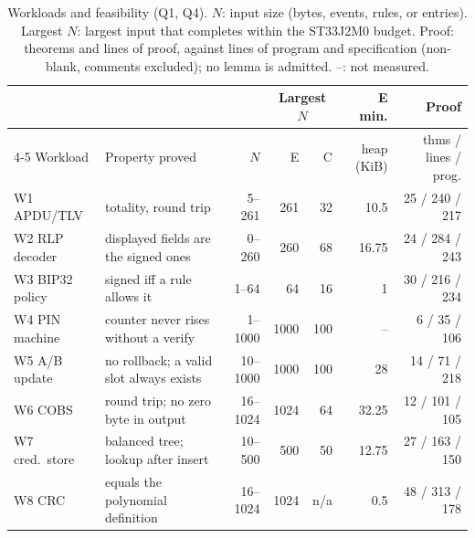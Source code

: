 \documentclass[runningheads]{llncs}
\begin{document}
\begin{table}
\centering
\caption{Workloads and feasibility (Q1, Q4). $N$: input size (bytes, events, rules, or entries). Largest $N$: largest input that completes within the ST33J2M0 budget. Proof: theorems and lines of proof, against lines of program and specification (non-blank, comments excluded); no lemma is admitted. --: not measured.}
\label{tab:workloads}
{\scriptsize
\setlength{\tabcolsep}{3pt}
\begin{tabular}{@{}l>{\raggedright\arraybackslash}p{2.95cm}rrrrr@{}}
\toprule
 & & & \multicolumn{2}{c}{Largest $N$} & E min. & Proof \\
\cmidrule(lr){4-5}
Workload & Property proved & $N$ & E & C & heap (KiB) & thms / lines / prog. \\
\midrule
W1 APDU/TLV & totality, round trip & 5--261 & 261 & 32 & 10.5 & 25 / 240 / 217 \\
W2 RLP decoder & displayed fields are the signed ones & 0--260 & 260 & 68 & 16.75 & 24 / 284 / 243 \\
W3 BIP32 policy & signed iff a rule allows it & 1--64 & 64 & 16 & 1 & 30 / 216 / 234 \\
W4 PIN machine & counter never rises without a verify & 1--1000 & 1000 & 100 & -- & 6 / 35 / 106 \\
W5 A/B update & no rollback; a valid slot always exists & 10--1000 & 1000 & 100 & 28 & 14 / 71 / 218 \\
W6 COBS & round trip; no zero byte in output & 16--1024 & 1024 & 64 & 32.25 & 12 / 101 / 105 \\
W7 cred.\ store & balanced tree; lookup after insert & 10--500 & 500 & 50 & 12.75 & 27 / 163 / 150 \\
W8 CRC & equals the polynomial definition & 16--1024 & 1024 & n/a & 0.5 & 48 / 313 / 178 \\
\bottomrule
\end{tabular}}
\end{table}
\end{document}
